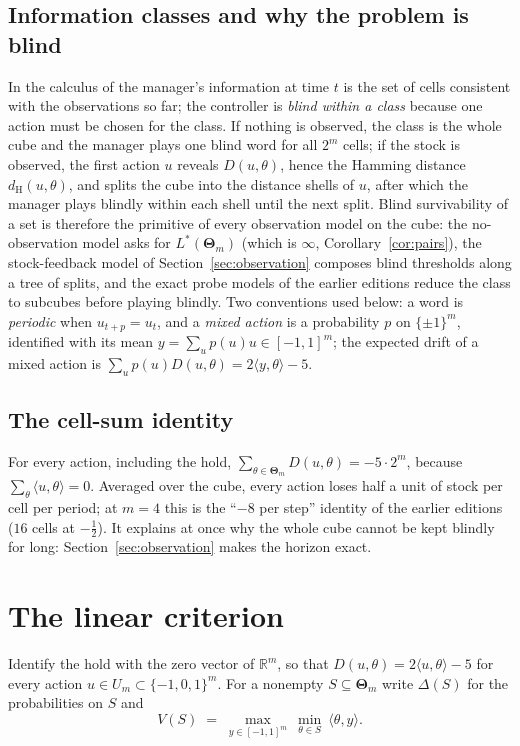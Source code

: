 \documentclass[11pt,a4paper]{article}
\theoremstyle{plain}
\theoremstyle{definition}
\theoremstyle{remark}
\newcommand{\R}{\mathbb{R}}
\let\GreekTheta\Theta
\renewcommand{\Theta}{\boldsymbol{\GreekTheta}}
\newcommand{\dH}{d_{\mathrm{H}}}
\newcommand{\tfr}[2]{\tfrac{#1}{#2}}
\newcommand{\Lstar}{L^{\ast}}
\begin{document}
\subsection{Information classes and why the problem is blind}
In the calculus of \cite{Abaee2026calc} the manager's information at time $t$ is the set of cells consistent with the observations so far; the controller is \emph{blind within a class} because one action must be chosen for the class. If nothing is observed, the class is the whole cube and the manager plays one blind word for all $2^m$ cells; if the stock is observed, the first action $u$ reveals $D(u,\theta)$, hence the Hamming distance $\dH(u,\theta)$, and splits the cube into the distance shells of $u$, after which the manager plays blindly within each shell until the next split. Blind survivability of a set is therefore the primitive of every observation model on the cube: the no-observation model asks for $\Lstar(\Theta_m)$ (which is $\infty$, Corollary~\ref{cor:pairs}), the stock-feedback model of Section~\ref{sec:observation} composes blind thresholds along a tree of splits, and the exact probe models of the earlier editions reduce the class to subcubes before playing blindly. Two conventions used below: a word is \emph{periodic} when $u_{t+p}=u_t$, and a \emph{mixed action} is a probability $p$ on $\{\pm1\}^m$, identified with its mean $y=\sum_u p(u)u\in[-1,1]^m$; the expected drift of a mixed action is $\sum_up(u)D(u,\theta)=2\langle y,\theta\rangle-5$.

\subsection{The cell-sum identity}
For every action, including the hold, $\sum_{\theta\in\Theta_m}D(u,\theta)=-5\cdot2^m$, because $\sum_\theta\langle u,\theta\rangle=0$. Averaged over the cube, every action loses half a unit of stock per cell per period; at $m=4$ this is the ``$-8$ per step'' identity of the earlier editions ($16$ cells at $-\tfr12$). It explains at once why the whole cube cannot be kept blindly for long: Section~\ref{sec:observation} makes the horizon exact.
\section{The linear criterion}\label{sec:criterion}

Identify the hold with the zero vector of $\R^m$, so that $D(u,\theta)=2\langle u,\theta\rangle-5$ for every action $u\in U_m\subset\{-1,0,1\}^m$. For a nonempty $S\subseteq\Theta_m$ write $\Delta(S)$ for the probabilities on $S$ and
\begin{equation}\label{eq:V}
V(S)\;=\;\max_{y\in[-1,1]^m}\ \min_{\theta\in S}\ \langle\theta,y\rangle .
\end{equation}
\end{document}
